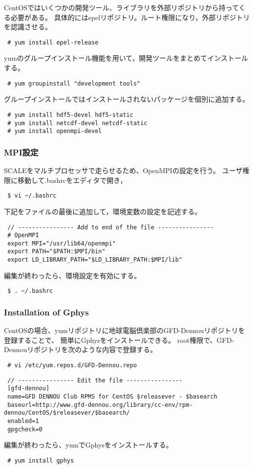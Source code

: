 CentOSではいくつかの開発ツール、ライブラリを外部リポジトリから持ってくる必要がある。
具体的にはepelリポジトリ。ルート権限になり，外部リポジトリを認識させる。
\begin{verbatim}
 # yum install epel-release
\end{verbatim}
yumのグループインストール機能を用いて，開発ツールをまとめてインストールする。
\begin{verbatim}
 # yum groupinstall "development tools"
\end{verbatim}
グループインストールではインストールされないパッケージを個別に追加する。
\begin{verbatim}
 # yum install hdf5-devel hdf5-static
 # yum install netcdf-devel netcdf-static
 # yum install openmpi-devel
\end{verbatim}


\subsubsection{MPI設定}

SCALEをマルチプロセッサで走らせるため、OpenMPIの設定を行う。
ユーザ権限に移動して.bashrcをエディタで開き，
\begin{verbatim}
 $ vi ~/.bashrc
\end{verbatim}
下記をファイルの最後に追加して，環境変数の設定を記述する。
\begin{verbatim}
 // ---------------- Add to end of the file ----------------
 # OpenMPI
 export MPI="/usr/lib64/openmpi"
 export PATH="$PATH:$MPI/bin"
 export LD_LIBRARY_PATH="$LD_LIBRARY_PATH:$MPI/lib"
\end{verbatim}
編集が終わったら、環境設定を有効にする。
\begin{verbatim}
 $ . ~/.bashrc
\end{verbatim}


\subsubsection{Installation of Gphys}

CentOSの場合、yumリポジトリに地球電脳倶楽部のGFD-Dennouリポジトリを登録することで、
簡単にGphysをインストールできる。
root権限で、GFD-Dennouリポジトリを次のような内容で登録する。

\begin{verbatim}
 # vi /etc/yum.repos.d/GFD-Dennou.repo
\end{verbatim}

\begin{verbatim}
 // ---------------- Edit the file ----------------
 [gfd-dennou]
 name=GFD DENNOU Club RPMS for CentOS $releasever - $basearch
 baseurl=http://www.gfd-dennou.org/library/cc-env/rpm-dennou/CentOS/$releasever/$basearch/
 enabled=1
 gpgcheck=0
\end{verbatim}
編集が終わったら、yumでGphysをインストールする。
\begin{verbatim}
 # yum install gphys
\end{verbatim}

